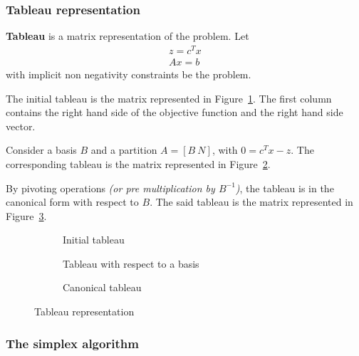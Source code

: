 \documentclass[english]{article}
\begin{document}
\subsubsection{Tableau representation}

\textbf{Tableau} is a matrix representation of the \LP problem.
Let
\[ \begin{matrix} z = c^T x \\ Ax = b \end{matrix}\] with implicit non negativity constraints be the \LP problem.

The initial tableau is the matrix represented in Figure~\ref{subfig:tableau-initial}.
The first column contains the right hand side of the objective function and the right hand side vector.

Consider a basis \(B\) and a partition \(A = \left[ B \ N \right]\), with \(0 = c^T x - z\).
The corresponding tableau is the matrix represented in Figure~\ref{subfig:tableau-basis}.

By pivoting operations \textit{(or pre multiplication by \(B^{-1}\))}, the tableau is in the canonical form with respect to \(B\).
The said tableau is the matrix represented in Figure~\ref{subfig:tableau-canonical}.

\begin{figure}[htbp]
  \centering
  \bigskip
  \begin{subfigure}[t]{0.99\textwidth}
    \centering
    \bigskip
    \caption{Initial tableau}
    \label{subfig:tableau-initial}
    \bigskip
  \end{subfigure}
  \bigskip
  \begin{subfigure}[b]{0.515\textwidth}
    \centering
    \bigskip
    \caption{Tableau with respect to a basis}
    \label{subfig:tableau-basis}
    \bigskip
  \end{subfigure}
  \begin{subfigure}[b]{0.475\textwidth}
    \centering
    \bigskip
    \caption{Canonical tableau}
    \label{subfig:tableau-canonical}
    \bigskip
  \end{subfigure}
  \caption{Tableau representation}
  \label{fig:tableau-representations}
  \bigskip
\end{figure}

\subsubsection{The simplex algorithm}
\end{document}
